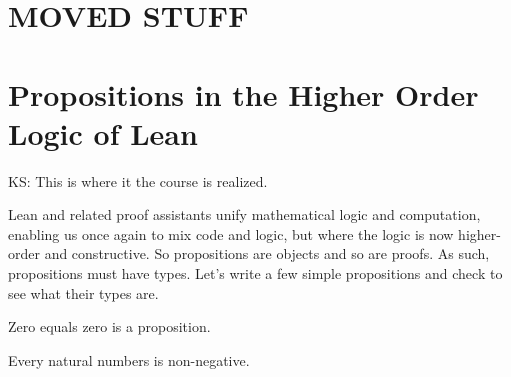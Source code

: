 \documentclass[letterpaper,10pt,english]{sphinxmanual}
\begin{document}
\begin{sphinxVerbatim}[commandchars=\\\{\}]
                  
\end{sphinxVerbatim}


\section{MOVED STUFF}
\label{\detokenize{15-proofs:moved-stuff}}

\section{Propositions in the Higher Order Logic of Lean}
\label{\detokenize{15-proofs:propositions-in-the-higher-order-logic-of-lean}}
KS: This is where it the course is realized.

Lean and related proof assistants unify mathematical logic and
computation, enabling us once again to mix code and logic, but where
the logic is now higher-order and constructive. So propositions are
objects and so are proofs. As such, propositions must have types. Let’s
write a few simple propositions and check to see what their types are.

Zero equals zero is a proposition.

\begin{sphinxVerbatim}[commandchars=\\\{\}]
 

 
\end{sphinxVerbatim}

Every natural numbers is non-negative.

\begin{sphinxVerbatim}[commandchars=\\\{\}]
      
\end{sphinxVerbatim}
\end{document}
